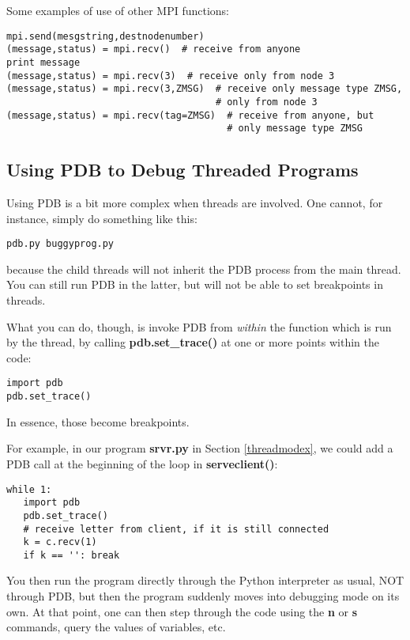 Some examples of use of other MPI functions:

\begin{Verbatim}[fontsize=\relsize{-2}]
mpi.send(mesgstring,destnodenumber)
(message,status) = mpi.recv()  # receive from anyone  
print message
(message,status) = mpi.recv(3)  # receive only from node 3
(message,status) = mpi.recv(3,ZMSG)  # receive only message type ZMSG, 
                                     # only from node 3 
(message,status) = mpi.recv(tag=ZMSG)  # receive from anyone, but 
                                       # only message type ZMSG
\end{Verbatim}

\subsection{Using PDB to Debug Threaded Programs}

Using PDB is a bit more complex when threads are involved.  One cannot,
for instance, simply do something like this:

\begin{Verbatim}[fontsize=\relsize{-2}]
pdb.py buggyprog.py
\end{Verbatim}

because the child threads will not inherit the PDB process from the main
thread.  You can still run PDB in the latter, but will not be able to
set breakpoints in threads.

What you can do, though, is invoke PDB from {\it within} the function which is
run by the thread, by calling {\bf pdb.set\_trace()} at one or more
points within the code:

\begin{Verbatim}[fontsize=\relsize{-2}]
import pdb
pdb.set_trace()
\end{Verbatim}

In essence, those become breakpoints. 

For example, in our program {\bf srvr.py} in Section \ref{threadmodex},
we could add a PDB call at the beginning of the loop in {\bf
serveclient()}:

\begin{Verbatim}[fontsize=\relsize{-2}]
while 1:
   import pdb
   pdb.set_trace()
   # receive letter from client, if it is still connected
   k = c.recv(1)
   if k == '': break
\end{Verbatim}

You then run the program directly through the Python interpreter as
usual, NOT through PDB, but then the program suddenly moves into
debugging mode on its own.  At that point, one can then step through the
code using the {\bf n} or {\bf s} commands, query the values of
variables, etc.

